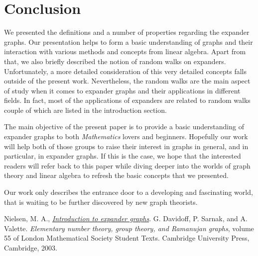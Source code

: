 \documentclass{article}
\theoremstyle{theorem}
\theoremstyle{definition}
\theoremstyle{example}
\theoremstyle{proposition}
\begin{document}
        \section{Conclusion}
        We presented the definitions and a number of properties regarding the expander graphs. Our presentation helps to form a basic understanding of graphs and their interaction with various methods and concepts from linear algebra. Apart from that, we also briefly described the notion of random walks on expanders. Unfortunately, a more detailed consideration of this very detailed concepts falls outside of the present work.
        Nevertheless, the random walks are the main aspect of study when it comes to expander graphs and their applications in different fields. In fact, most of the applications of expanders are related to random walks couple of which are listed in the introduction section.

        The main objective of the present paper is to provide a basic understanding of expander graphs to both \textit{Mathematics} lovers and beginners. Hopefully our work will help both of those groups to raise their interest in graphs in general, and in particular, in expander graphs. If this is the case, we hope that the interested readers will refer back to this paper while diving deeper into the worlds of graph theory and linear algebra to refresh the basic concepts that we presented.

        Our work only describes the entrance door to a developing and fascinating world, that is waiting to be further discovered by new graph theorists.

    \begin{thebibliography}{99}
         Nielsen, M. A., \href{https://michaelnielsen.org/people/nielsen/blog/archive/notes/expander\_graphs.pdf}{\textit{Introduction to expander graphs}}.
         G. Davidoff, P. Sarnak, and A. Valette. \textit{Elementary number theory, group theory, and Ramanujan graphs}, volume 55 of London Mathematical Society Student Texts. Cambridge University Press, Cambridge, 2003.
    \end{thebibliography} 
\end{document}
